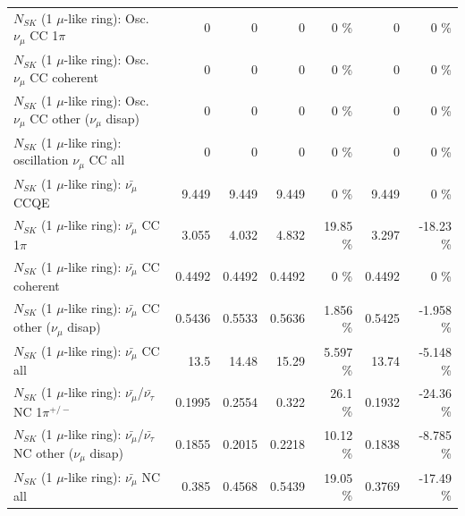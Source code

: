 \begin{table}
\begin{tabular}{| l | r | r | r  r | r  r |}
                          $N_{SK}$ (1 $\mu$-like ring): Osc. $\nu_\mu$ CC 1$\pi$ &               0 &               0 &               0 &        0 \%  &               0 &        0 \%  \\ 
                        $N_{SK}$ (1 $\mu$-like ring): Osc. $\nu_\mu$ CC coherent &               0 &               0 &               0 &        0 \%  &               0 &        0 \%  \\ 
         $N_{SK}$ (1 $\mu$-like ring): Osc. $\nu_\mu$ CC other ($\nu_\mu$ disap) &               0 &               0 &               0 &        0 \%  &               0 &        0 \%  \\ 
                      $N_{SK}$ (1 $\mu$-like ring): oscillation $\nu_\mu$ CC all &               0 &               0 &               0 &        0 \%  &               0 &        0 \%  \\ 
\hline
\hline
                              $N_{SK}$ (1 $\mu$-like ring): $\bar{\nu_\mu}$ CCQE &           9.449 &           9.449 &           9.449 &        0 \%  &           9.449 &        0 \%  \\ 
                         $N_{SK}$ (1 $\mu$-like ring): $\bar{\nu_\mu}$ CC 1$\pi$ &           3.055 &           4.032 &           4.832 &    19.85 \%  &           3.297 &   -18.23 \%  \\ 
                       $N_{SK}$ (1 $\mu$-like ring): $\bar{\nu_\mu}$ CC coherent &          0.4492 &          0.4492 &          0.4492 &        0 \%  &          0.4492 &        0 \%  \\ 
        $N_{SK}$ (1 $\mu$-like ring): $\bar{\nu_\mu}$ CC other ($\nu_\mu$ disap) &          0.5436 &          0.5533 &          0.5636 &    1.856 \%  &          0.5425 &   -1.958 \%  \\ 
                          $N_{SK}$ (1 $\mu$-like ring): $\bar{\nu_{\mu}}$ CC all &            13.5 &           14.48 &           15.29 &    5.597 \%  &           13.74 &   -5.148 \%  \\ 
\hline
  $N_{SK}$ (1 $\mu$-like ring): $\bar{\nu_\mu}$/$\bar{\nu_\tau}$ NC 1$\pi^{+/-}$ &          0.1995 &          0.2554 &           0.322 &     26.1 \%  &          0.1932 &   -24.36 \%  \\ 
$N_{SK}$ (1 $\mu$-like ring): $\bar{\nu_\mu}$/$\bar{\nu_\tau}$ NC other ($\nu_\mu$ disap) &          0.1855 &          0.2015 &          0.2218 &    10.12 \%  &          0.1838 &   -8.785 \%  \\ 
                          $N_{SK}$ (1 $\mu$-like ring): $\bar{\nu_{\mu}}$ NC all &           0.385 &          0.4568 &          0.5439 &    19.05 \%  &          0.3769 &   -17.49 \%  \\ 

\end{tabular}
\end{table}
